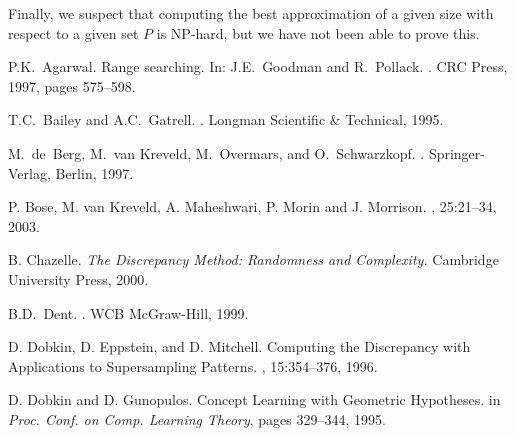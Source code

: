 \documentclass{elsart}
\begin{document}
Finally, we suspect that computing the best approximation of a given
size with respect to a given set $P$ is NP-hard, but we have not been
able to prove this.



\begin{thebibliography}{99}
\frenchspacing

  P.K.~Agarwal.
  Range searching. In: J.E.~Goodman and R.~Pollack.
  .
  \newblock CRC Press, 1997, pages 575--598.
  
  T.C.~Bailey and A.C.~Gatrell.
  .
  \newblock Longman Scientific \& Technical, 1995.


  M.~de~Berg, M.~van Kreveld, M.~Overmars, and O.~Schwarzkopf.
  .
  \newblock Springer-Verlag, Berlin, 1997.

  P. Bose, M. van Kreveld, A. Maheshwari, P. Morin and J. Morrison.
  ,
  25:21--34, 2003. 
  
  B. Chazelle.
  \newblock \emph{The Discrepancy Method: Randomness and Complexity.}
  \newblock Cambridge University Press, 2000.

  B.D.~Dent.
  .
  \newblock WCB McGraw-Hill, 1999.


D. Dobkin, D. Eppstein, and D. Mitchell.
\newblock Computing the Discrepancy with Applications to Supersampling Patterns.
, 15:354--376, 1996.

D. Dobkin and D. Gunopulos.
\newblock Concept Learning with Geometric Hypotheses.
\newblock in {\em Proc. Conf. on Comp. Learning Theory}, pages 329--344, 1995.


\end{thebibliography}
\end{document}
